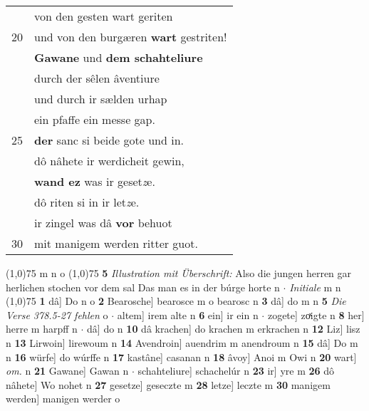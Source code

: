 \documentclass[8pt,a4paper,notitlepage]{article}
\begin{document}
\begin{table}[ht]
\begin{minipage}[t]{0.5\linewidth}
\begin{tabular}{rl}
 & von den gesten wart geriten\\ 
20 & und von den burgæren \textbf{wart} gestriten!\\ 
 & \textbf{Gawane} und \textbf{dem schahteliure}\\ 
 & durch der sêlen âventiure\\ 
 & und durch ir sælden urhap\\ 
 & ein pfaffe ein messe gap.\\ 
25 & \textbf{der} sanc si beide gote und in.\\ 
 & dô nâhete ir werdicheit gewin,\\ 
 & \textbf{wand ez} was ir geset\textit{z}e.\\ 
 & dô riten si in ir let\textit{z}e.\\ 
 & ir zingel was dâ \textbf{vor} behuot\\ 
30 & mit manigem werden ritter guot.\\ 
\end{tabular}
\scriptsize
\line(1,0){75} \newline
m n o \newline
\line(1,0){75} \newline
\textbf{5} \textit{Illustration mit Überschrift:} Also die jungen herren gar herlichen stochen vor dem sal Das man es in der búrge horte n   $\cdot$ \textit{Initiale} m n  \newline
\line(1,0){75} \newline
\textbf{1} dâ] Do n o \textbf{2} Bearosche] bearosce m o bearosc n \textbf{3} dâ] do m n \textbf{5} \textit{Die Verse 378.5-27 fehlen} o   $\cdot$ altem] irem alte n \textbf{6} ein] ir ein n  $\cdot$ zogete] zoͯigte n \textbf{8} her] herre m harpff n  $\cdot$ dâ] do n \textbf{10} dâ krachen] do krachen m erkrachen n \textbf{12} Liz] lisz n \textbf{13} Lirwoin] lirewoum n \textbf{14} Avendroin] auendrim m anendroum n \textbf{15} dâ] Do m n \textbf{16} würfe] do wúrffe n \textbf{17} kastâne] casanan n \textbf{18} âvoy] Anoi m Owi n \textbf{20} wart] \textit{om.} n \textbf{21} Gawane] Gawan n  $\cdot$ schahteliure] schachelúr n \textbf{23} ir] yre m \textbf{26} dô nâhete] Wo nohet n \textbf{27} gesetze] geseczte m \textbf{28} letze] leczte m \textbf{30} manigem werden] manigen werder o \newline
\end{minipage}
\end{table}
\newpage
\end{document}
